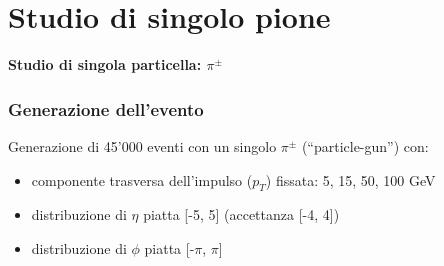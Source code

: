 \documentclass{beamer}
\begin{document}
\section{Studio di singolo pione}

\begin{frame}
\begin{center}
\huge{\textbf{\color{dred} Studio di singola particella: $\pi^{\pm}$}}
\end{center}
\end{frame}


\begin{frame}
\frametitle{Generazione dell'evento}

Generazione di 45'000 eventi con un singolo $\pi^{\pm}$ (``particle-gun'') con:
{
\begin{itemize}
\item<1-> componente trasversa dell'impulso ($p_{T}$) fissata: 5, 15, 50, 100 GeV
\item<1-> distribuzione di $\eta$ piatta [-5, 5] (accettanza [-4, 4])
\item<1-> distribuzione di $\phi$ piatta [-$\pi$, $\pi$]
\end{itemize}}
\bigskip
{}
\bigskip
{}

\end{frame}

\end{document}

